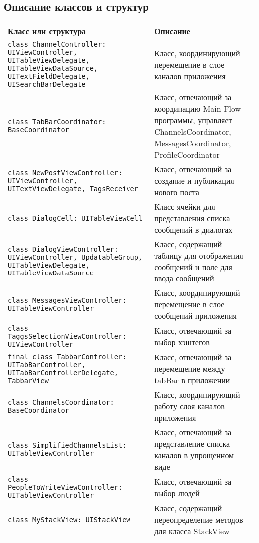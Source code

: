 \subsection*{Описание классов и структур}

\begin{longtable}{| >{\raggedright\arraybackslash}p{} | p{}|}
\hline
\textbf{Класс или структура} & \textbf{Описание} \\ \hline
\texttt{class ChannelController: UIViewController, UITableViewDelegate, UITableViewDataSource, UITextFieldDelegate, UISearchBarDelegate} & {Класс, координирующий перемещение в слое каналов приложения} \\ \hline
\texttt{class TabBarCoordinator: BaseCoordinator} & {Класс, отвечающий за координацию Main Flow программы, управляет ChannelsCoordinator, MessagesCoordinator, ProfileCoordinator} \\ \hline
\texttt{class NewPostViewController: UIViewController, UITextViewDelegate, TagsReceiver} & {Класс, отвечающий за создание и публикация нового поста} \\ \hline
\texttt{class DialogCell: UITableViewCell} & {Класс ячейки для представления списка сообщений в диалогах} \\ \hline
\texttt{class DialogViewController: UIViewController, UpdatableGroup, UITableViewDelegate, UITableViewDataSource} & {Класс, содержащий таблицу для отображения сообщений и поле для ввода сообщений} \\ \hline
\texttt{class MessagesViewController: UITableViewController} & {Класс, координирующий перемещение в слое сообщений приложения} \\ \hline
\texttt{class TaggsSelectionViewController: UIViewController} & {Класс, отвечающий за выбор хэштегов} \\ \hline
\texttt{final class TabbarController: UITabBarController, UITabBarControllerDelegate, TabbarView} & {Класс, отвечающий за перемещение между tabBar в приложении} \\ \hline
\texttt{class ChannelsCoordinator: BaseCoordinator} & {Класс, координирующий работу слоя каналов приложения} \\ \hline
\texttt{class SimplifiedChannelsList: UITableViewController} & {Класс, отвечающий за представление списка каналов в упрощенном виде} \\ \hline
\texttt{class PeopleToWriteViewController: UITableViewController} & {Класс, отвечающий за выбор людей} \\ \hline
\texttt{class MyStackView: UIStackView} & {Класс, содержащий переопределение методов для класса StackView} \\ \hline

\end{longtable}
